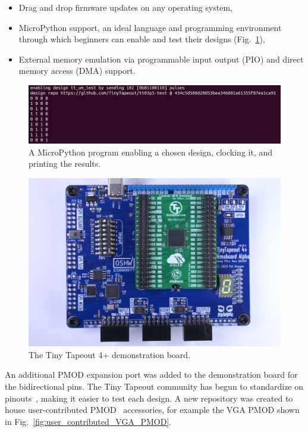 \begin{itemize}
\item Drag and drop firmware updates on any operating system,
\item MicroPython\cite{micropython} support, an ideal language and programming environment through which beginners can enable and test their designs (Fig.~\ref{fig:micropython_program}),
\item External memory emulation via programmable input output (PIO) and direct memory access (DMA) support.
\end{itemize}

\begin{figure}[!t]
\centering
\includegraphics[width=\columnwidth]{./Figs/tt3p5 enable design.png}
\caption{A MicroPython program\cite{demofirmwaretest} enabling a chosen design, clocking it, and printing the results.}
\label{fig:micropython_program}
\end{figure}

\begin{figure}[!t]
\centering
\includegraphics[width=\columnwidth]{./Figs/tt04-demoboard-top.jpg}
\caption{The Tiny Tapeout 4+ demonstration board\cite{tt04demoboard}.}
\label{fig:TT04plus_demo_board}
\end{figure}

An additional PMOD expansion port was added to the demonstration board for the bidirectional pins. The Tiny Tapeout community has begun to standardize on pinouts~\cite{pinouts}, making it easier to test each design.
A new repository was created to house user-contributed PMOD~\cite{awesomepmods} accessories, for example the VGA PMOD shown in Fig.~\ref{fig:user_contributed_VGA_PMOD}.


